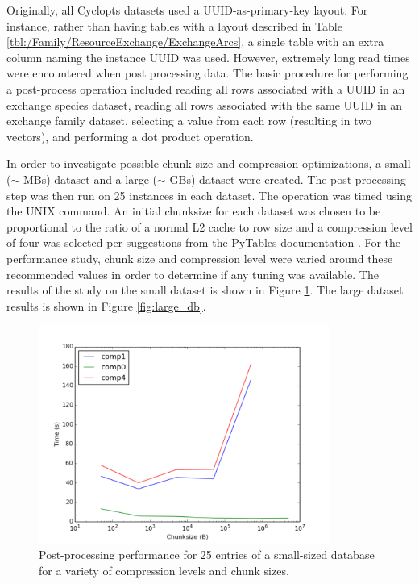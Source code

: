 Originally, all Cyclopts datasets used a UUID-as-primary-key layout. For
instance, rather than having tables with a layout described in Table
\ref{tbl:/Family/ResourceExchange/ExchangeArcs}, a single table with an extra
column naming the instance UUID was used. However, extremely long read times
were encountered when post processing data. The basic procedure for performing a
post-process operation included reading all rows associated with a UUID in an
exchange species dataset, reading all rows associated with the same UUID in an
exchange family dataset, selecting a value from each row (resulting in two
vectors), and performing a dot product operation.

In order to investigate possible chunk size and compression optimizations, a
small ($\sim$ MBs) dataset and a large ($\sim$ GBs) dataset were created. The
post-processing step was then run on 25 instances in each dataset. The operation
was timed using the UNIX  command. An initial chunksize for each
dataset was chosen to be proportional to the ratio of a normal L2 cache to row
size and a compression level of four was selected per suggestions from the
PyTables documentation \cite{tablesopt}. For the performance study, chunk size
and compression level were varied around these recommended values in order to
determine if any tuning was available. The results of the study on the small
dataset is shown in Figure \ref{fig:small_db}. The large dataset results is
shown in Figure \ref{fig:large_db}.

\begin{figure}
  \begin{center}
    \includegraphics[width=0.85\textwidth]{./backmatter/figs/small_all.pdf}
    \caption{
      \label{fig:small_db}
      Post-processing performance for 25 entries of a small-sized database for a 
      variety of compression levels and chunk sizes.}
  \end{center}
\end{figure}

